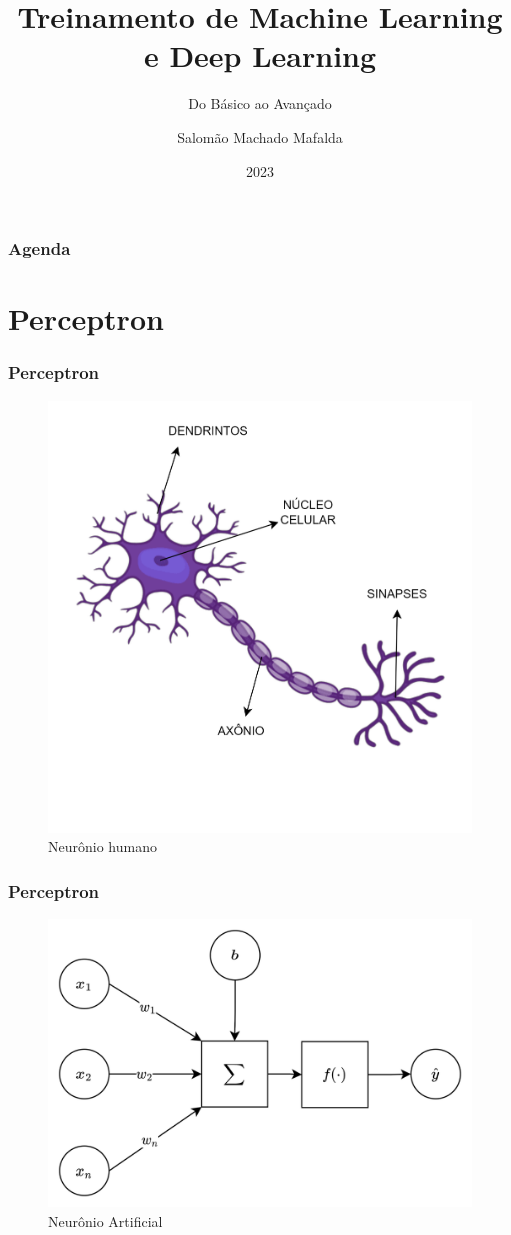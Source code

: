 \documentclass{beamer}
\title[Machine Learning]
{Treinamento de Machine Learning e Deep Learning}
\subtitle{Do Básico ao Avançado}
\author[Mafalda, Salomão] %
{Salomão Machado Mafalda\inst{1}}
\institute[PAVIC] %
{
  \inst{1}%
  Universidade Federal do Acre\\
  PAVIC

}
\date[2023] %
{2023}
\begin{document}
\frame{\titlepage}

\begin{frame}
\frametitle{Agenda}
\tableofcontents
\end{frame}



\section{Perceptron}

\begin{frame}
	\frametitle{Perceptron}
	\begin{figure}
		\centering
		\label{fig:neuron}
		\includegraphics[width=0.4\linewidth]{neuron}
		\caption{Neurônio humano}
	\end{figure}
\end{frame}


\begin{frame}
	\frametitle{Perceptron}
	\begin{figure}
		\centering
		\includegraphics[width=0.4\linewidth]{figures/neuron_ai}
		\caption{Neurônio Artificial}
		\label{fig:neuronai}
	\end{figure}
\end{frame}
\end{document}
